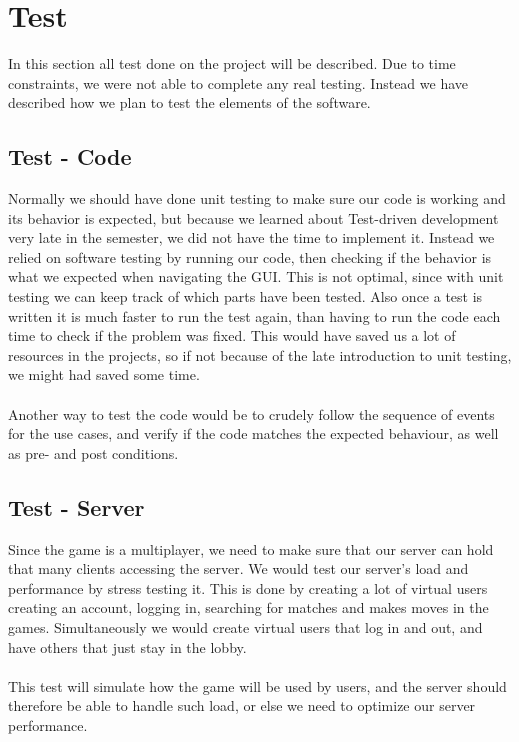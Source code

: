 
\chapter{Test}
	In this section all test done on the project will be described.
  Due to time constraints, we were not able to complete any real testing.
   Instead we have described how we plan to test the elements of the software.
		\section{Test - Code}
Normally we should have done unit testing to make sure our code is working
 and its behavior is expected, but because we learned about Test-driven
 development very late in the semester, we did not have the time to implement
 it. Instead we relied on software testing by running our code, then checking
  if the behavior is what we expected when navigating the GUI. This is not
  optimal, since with unit testing we can keep track of which parts have been
   tested. Also once a test is written it is much faster to run the test again,
    than having to run the code each time to check if the problem was fixed.
    This would have saved us a lot of resources in the projects, so if not
    because of the late introduction to unit testing, we might had saved
    some time.
\\
\\
Another way to test the code would be to crudely follow the sequence of events
 for the use cases, and verify if the code matches the expected behaviour,
  as well as pre- and post conditions.
		\section{Test - Server}
Since the game is a multiplayer, we need to make sure that our server can
 hold that many clients accessing the server. We would test our server’s load
 and performance by stress testing it. This is done by creating a lot of
  virtual users creating an account, logging in, searching for matches and
  makes moves in the games. Simultaneously we would create virtual users
  that log in and out, and have others that just stay in the lobby.
\\
\\
This test will simulate how the game will be used by users, and the server
 should therefore be able to handle such load, or else we need to optimize
  our server performance.
